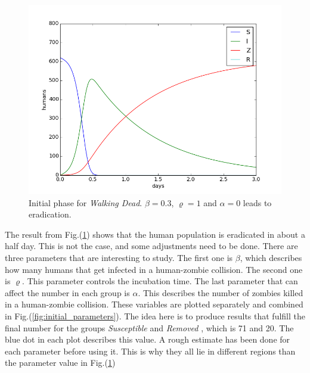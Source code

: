 \documentclass[%
twoside,                 %
final,                   %
chapterprefix=true,      %
open=right               %
10pt]{book}
\begin{document}
\begin{figure}[ht]
  \centerline{\includegraphics[width=0.9\linewidth]{1_fig/WD_zombie_initial_1.png}}
  \caption{
  \label{fig:initial_phase_1} Initial phase for \emph{Walking Dead}. $\beta=0.3$, $\varrho=1$ and $\alpha=0$ leads to eradication.
  }
\end{figure}


The result from Fig.(\ref{fig:initial_phase_1}) shows that the human population is eradicated in about a half day. This is not the case, and some adjustments need to be done. There are three parameters that are interesting to study. The first one is $\beta$, which describes how many humans that get infected in a human-zombie collision. The second one is $\varrho$. This parameter controls the incubation time. The last parameter that can affect the number in each group is $\alpha$. This describes the number of zombies killed in a human-zombie collision. These variables are plotted separately and combined in Fig.(\ref{fig:initial_parameters}). The idea here is to produce results that fulfill the final number for the groups \emph{Susceptible} and \emph{Removed} , which is 71 and 20. The blue dot in each plot describes this value. A rough estimate has been done for each parameter before using it. This is why they all lie in different regions than the parameter value in Fig.(\ref{fig:initial_phase_1})
\end{document}
